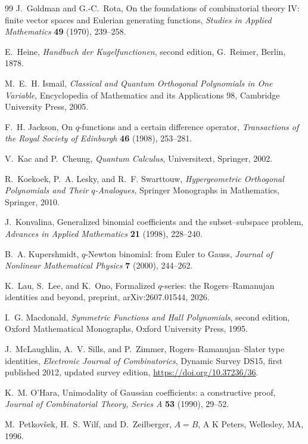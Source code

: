 \documentclass[11pt,a4paper,oneside,openany]{book}
\theoremstyle{definition}
\theoremstyle{remark}
\begin{document}
\begin{thebibliography}{99}
J.~Goldman and G.-C.~Rota,
On the foundations of combinatorial theory IV: finite vector spaces and Eulerian generating functions,
\emph{Studies in Applied Mathematics} \textbf{49} (1970), 239--258.

E.~Heine,
\emph{Handbuch der Kugelfunctionen}, second edition,
G.~Reimer, Berlin, 1878.

M.~E.~H. Ismail,
\emph{Classical and Quantum Orthogonal Polynomials in One Variable},
Encyclopedia of Mathematics and its Applications 98, Cambridge University Press, 2005.

F.~H. Jackson,
On $q$-functions and a certain difference operator,
\emph{Transactions of the Royal Society of Edinburgh} \textbf{46} (1908), 253--281.

V.~Kac and P.~Cheung,
\emph{Quantum Calculus},
Universitext, Springer, 2002.

R.~Koekoek, P.~A. Lesky, and R.~F. Swarttouw,
\emph{Hypergeometric Orthogonal Polynomials and Their $q$-Analogues},
Springer Monographs in Mathematics, Springer, 2010.

J.~Konvalina,
Generalized binomial coefficients and the subset--subspace problem,
\emph{Advances in Applied Mathematics} \textbf{21} (1998), 228--240.

B.~A. Kupershmidt,
$q$-Newton binomial: from Euler to Gauss,
\emph{Journal of Nonlinear Mathematical Physics} \textbf{7} (2000), 244--262.

K.~Lau, S.~Lee, and K.~Ono,
Formalized $q$-series: the Rogers--Ramanujan identities and beyond,
preprint, arXiv:2607.01544, 2026.

I.~G. Macdonald,
\emph{Symmetric Functions and Hall Polynomials}, second edition,
Oxford Mathematical Monographs, Oxford University Press, 1995.

J.~McLaughlin, A.~V. Sills, and P.~Zimmer,
Rogers--Ramanujan--Slater type identities,
\emph{Electronic Journal of Combinatorics}, Dynamic Survey DS15,
first published 2012, updated survey edition,
\url{https://doi.org/10.37236/36}.

K.~M. O'Hara,
Unimodality of Gaussian coefficients: a constructive proof,
\emph{Journal of Combinatorial Theory, Series A} \textbf{53} (1990), 29--52.

M.~Petkov\v{s}ek, H.~S. Wilf, and D.~Zeilberger,
\emph{$A=B$},
A K Peters, Wellesley, MA, 1996.


\end{thebibliography}
\end{document}

